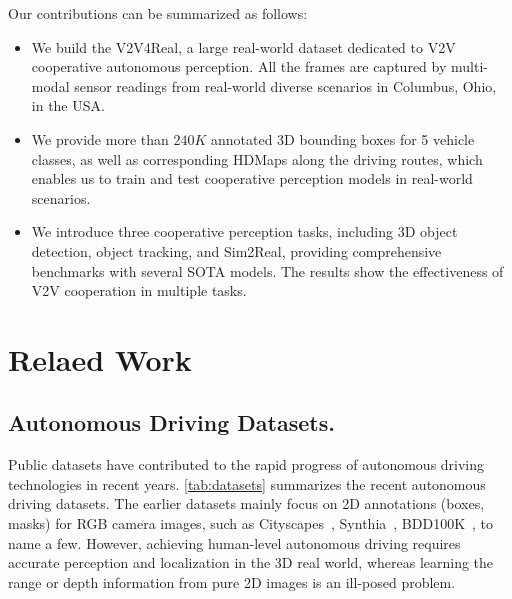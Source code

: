 \documentclass[10pt,twocolumn,letterpaper]{article}
\begin{document}
Our contributions can be summarized as follows:
\begin{itemize}
 \setlength{\parskip}{0pt}
  \setlength{\itemsep}{0pt plus 0pt}
    \item We build the V2V4Real, 
    a large real-world dataset dedicated to V2V cooperative autonomous perception. All the frames are captured by multi-modal sensor readings from real-world diverse scenarios in Columbus, Ohio, in the USA.
    \item We provide more than $240K$ annotated 3D bounding boxes for 5 vehicle classes, as well as corresponding HDMaps along the driving routes, which enables us to train and test cooperative perception models in real-world scenarios. 
    \item We introduce three cooperative perception tasks, including 3D object detection, object tracking, and Sim2Real, providing comprehensive benchmarks with several SOTA models. The results show the effectiveness of V2V cooperation in multiple tasks.
\end{itemize}



\section{Relaed Work}
\label{sec:related-work}


\subsection{Autonomous Driving Datasets.}

Public datasets have contributed to the rapid progress of autonomous driving technologies in recent years. \cref{tab:datasets} summarizes the recent autonomous driving datasets.
The earlier datasets mainly focus on 2D annotations (boxes, masks) for RGB camera images, such as Cityscapes~\cite{cordts2016cityscapes}, Synthia~\cite{ros2016synthia}, BDD100K~\cite{yu2020bdd100k}, to name a few.
However, achieving human-level autonomous driving requires accurate perception and localization in the 3D real world, whereas learning the range or depth information from pure 2D images is an ill-posed problem.
\end{document}
